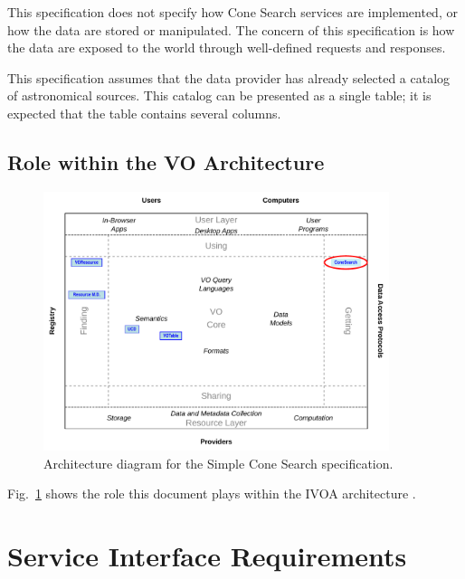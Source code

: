 \documentclass[11pt,a4paper]{ivoa}
\begin{document}
This specification does not specify how Cone Search services are implemented, or how the data are stored or manipulated. The concern of this specification is how the data are exposed to the world through well-defined requests and responses.

This specification assumes that the data provider has already selected a catalog of astronomical sources. This catalog can be presented as a single table; it is expected that the table contains several columns.

\subsection{Role within the VO Architecture}

\begin{figure}
\centering


\includegraphics[width=0.9\textwidth]{role_diagram}
\caption{Architecture diagram for the Simple Cone Search specification.}
\label{fig:archdiag}
\end{figure}

Fig.~\ref{fig:archdiag} shows the role this document plays within the
IVOA architecture \citep{note:VOARCH}.

\section{Service Interface Requirements}
\label{sec:2}
\end{document}
